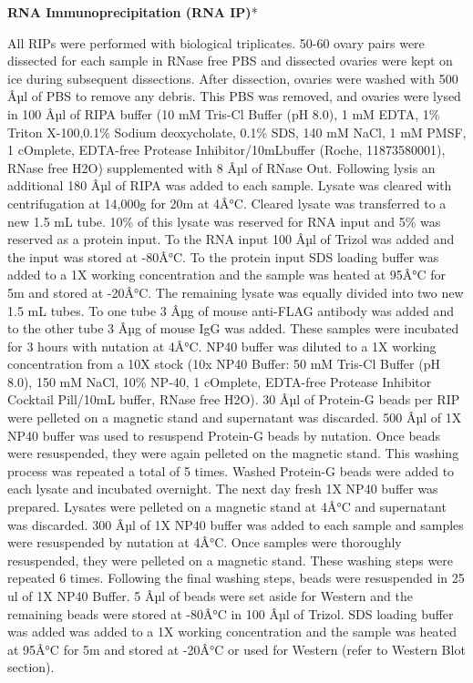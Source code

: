 \documentclass[12pt,oneside]{reedthesis}
\begin{document}
\textbf{RNA Immunoprecipitation (RNA IP)}*

All RIPs were performed with biological triplicates. 50-60 ovary pairs
were dissected for each sample in RNase free PBS and dissected ovaries
were kept on ice during subsequent dissections. After dissection,
ovaries were washed with 500 Âµl of PBS to remove any debris. This PBS
was removed, and ovaries were lysed in 100 Âµl of RIPA buffer (10 mM
Tris-Cl Buffer (pH 8.0), 1 mM EDTA, 1\% Triton X-100,0.1\% Sodium
deoxycholate, 0.1\% SDS, 140 mM NaCl, 1 mM PMSF, 1 cOmplete, EDTA-free
Protease Inhibitor/10mLbuffer (Roche, 11873580001), RNase free H2O)
supplemented with 8 Âµl of RNase Out. Following lysis an additional 180
Âµl of RIPA was added to each sample. Lysate was cleared with
centrifugation at 14,000g for 20m at 4Â°C. Cleared lysate was transferred
to a new 1.5 mL tube. 10\% of this lysate was reserved for RNA input and
5\% was reserved as a protein input. To the RNA input 100 Âµl of Trizol
was added and the input was stored at -80Â°C. To the protein input SDS
loading buffer was added to a 1X working concentration and the sample
was heated at 95Â°C for 5m and stored at -20Â°C. The remaining lysate was
equally divided into two new 1.5 mL tubes. To one tube 3 Âµg of mouse
anti-FLAG antibody was added and to the other tube 3 Âµg of mouse IgG was
added. These samples were incubated for 3 hours with nutation at 4Â°C.
NP40 buffer was diluted to a 1X working concentration from a 10X stock
(10x NP40 Buffer: 50 mM Tris-Cl Buffer (pH 8.0), 150 mM NaCl, 10\% NP-40,
1 cOmplete, EDTA-free Protease Inhibitor Cocktail Pill/10mL buffer,
RNase free H2O). 30 Âµl of Protein-G beads per RIP were pelleted on a
magnetic stand and supernatant was discarded. 500 Âµl of 1X NP40 buffer
was used to resuspend Protein-G beads by nutation. Once beads were
resuspended, they were again pelleted on the magnetic stand. This
washing process was repeated a total of 5 times. Washed Protein-G beads
were added to each lysate and incubated overnight. The next day fresh 1X
NP40 buffer was prepared. Lysates were pelleted on a magnetic stand at
4Â°C and supernatant was discarded. 300 Âµl of 1X NP40 buffer was added to
each sample and samples were resuspended by nutation at 4Â°C. Once
samples were thoroughly resuspended, they were pelleted on a magnetic
stand. These washing steps were repeated 6 times. Following the final
washing steps, beads were resuspended in 25 ul of 1X NP40 Buffer. 5 Âµl
of beads were set aside for Western and the remaining beads were stored
at -80Â°C in 100 Âµl of Trizol. SDS loading buffer was added was added to
a 1X working concentration and the sample was heated at 95Â°C for 5m and
stored at -20Â°C or used for Western (refer to Western Blot section).
\end{document}
